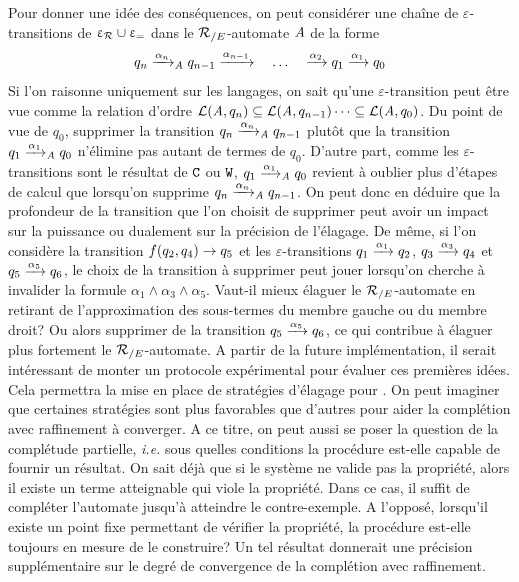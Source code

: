 Pour donner une idée des conséquences, on peut considérer une chaîne de $\varepsilon$-transitions
de $\upvarepsilon_{\mathcal R} \cup \upvarepsilon_{=}$ dans le ${\mathcal R_{/E}}$-automate $\mathit A$ de la forme
\[q_n \xrightarrow{\alpha_n}_\mathit A q_{n-1} \xrightarrow{\alpha_{n-1}} \quad \dots \quad \xrightarrow{\alpha_2} q_1 \xrightarrow{\alpha_1} q_0\]
Si l'on raisonne uniquement sur les langages, on sait qu'une $\varepsilon$-transition peut être vue comme
la relation d'ordre $\mathcal{L}(\mathit A,q_n) \subseteq \mathcal{L}(\mathit A,q_{n-1}) \dots \subseteq \mathcal{L}(\mathit A,q_0)$.
Du point de vue de $q_0$, supprimer la transition $q_n \xrightarrow{\alpha_n}_\mathit A q_{n-1}$ plutôt que la transition
$q_1 \xrightarrow{\alpha_1}_\mathit A q_0$ n'élimine pas autant de termes de $q_0$. D'autre part, comme les $\varepsilon$-transitions 
sont le résultat de $\mathtt{C}$ ou $\mathtt{W}$, $q_1 \xrightarrow{\alpha_1}_\mathit A q_{0}$ revient à oublier plus d'étapes de calcul
que lorsqu'on supprime $q_n \xrightarrow{\alpha_n}_\mathit A q_{n-1}$. On peut donc en déduire que la profondeur de la transition
que l'on choisit de supprimer peut avoir un impact sur la puissance ou dualement sur la précision de l'élagage.
De même, si l'on considère la transition $f(q_2,q_4) \rightarrow q_5$ et les $\varepsilon$-transitions $q_1 \xrightarrow{\alpha_1} q_2$,
$q_3 \xrightarrow{\alpha_3} q_4$ et $q_5 \xrightarrow{\alpha_5} q_6$, le choix de la transition à supprimer peut jouer lorsqu'on
cherche à invalider la formule $\alpha_1 \land \alpha_3 \land \alpha_5$. Vaut-il mieux élaguer le ${\mathcal R_{/E}}$-automate 
en retirant de l'approximation des sous-termes du membre gauche ou du membre droit? Ou alors supprimer de la transition
$q_5 \xrightarrow{\alpha_5} q_6$, ce qui contribue à élaguer plus fortement le ${\mathcal R_{/E}}$-automate.
A partir de la future implémentation, il serait intéressant de monter un protocole expérimental pour évaluer 
ces premières idées. Cela permettra la mise en place de stratégies d'élagage pour \timbuk.
On peut imaginer que certaines stratégies sont plus favorables que d'autres pour aider la complétion
avec raffinement à converger.
A ce titre, on peut aussi se poser la question de la complétude partielle, \textit{i.e.} sous quelles conditions la procédure
est-elle capable de fournir un résultat. On sait déjà que si le système ne valide pas la propriété, alors il existe un terme atteignable
qui viole la propriété. Dans ce cas, il suffit de compléter l'automate jusqu'à atteindre le contre-exemple.
A l'opposé, lorsqu'il existe un point fixe permettant de vérifier la propriété, la procédure est-elle toujours en mesure
de le construire? Un tel résultat donnerait une précision supplémentaire sur le degré de convergence de la complétion avec raffinement.








